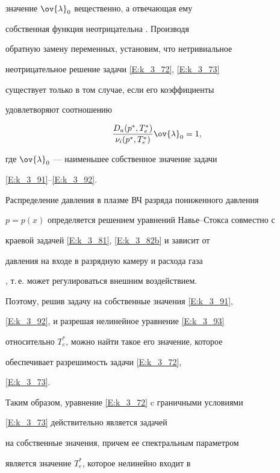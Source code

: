 значение $\ov{\lambda}_0$ вещественно, а отвечающая ему


собственная функция неотрицательна \cite{ZltLyd}. Производя


обратную замену переменных, установим, что нетривиальное


неотрицательное решение задачи \eqref{E:k_3_72}, \eqref{E:k_3_73}


существует только в том случае, если его коэффициенты


удовлетворяют соотношению


\begin{equation}\label{E:k_3_93}


\frac{D_a(p^\ast,T_e^\ast)}{{\nu}_{i} (p^\ast, T_e^\ast)}\ov{\lambda}_0=1,


\end{equation}


где $\ov{\lambda}_0$ --- наименьшее собственное значение задачи


\eqref{E:k_3_91}--\eqref{E:k_3_92}.





Распределение давления в плазме ВЧ разряда пониженного давления


$p=p(x)$ определяется решением уравнений Навье--Стокса совместно с


краевой задачей \eqref{E:k_3_81}, \eqref{E:k_3_82b} и зависит от


давления на входе в разрядную камеру и расхода газа


\cite{my_book}, т.\,е. может регулироваться внешним воздействием.


Поэтому, решив задачу на собственные значения \eqref{E:k_3_91},


\eqref{E:k_3_92}, и разрешая нелинейное уравнение \eqref{E:k_3_93}


относительно $T_e^\ast$, можно найти такое его значение, которое


обеспечивает разрешимость задачи \eqref{E:k_3_72},


\eqref{E:k_3_73}.





Таким образом, уравнение \eqref{E:k_3_72} c граничными условиями


\eqref{E:k_3_73} действительно является задачей


на собственные значения, причем ее спектральным параметром


является значение $T_e^\ast$, которое нелинейно входит в


